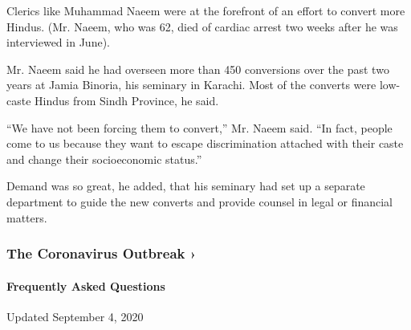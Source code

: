 Clerics like Muhammad Naeem were at the forefront of an effort to
convert more Hindus. (Mr. Naeem, who was 62, died of cardiac arrest two
weeks after he was interviewed in June).

Mr. Naeem said he had overseen more than 450 conversions over the past
two years at Jamia Binoria, his seminary in Karachi. Most of the
converts were low-caste Hindus from Sindh Province, he said.

``We have not been forcing them to convert,'' Mr. Naeem said. ``In fact,
people come to us because they want to escape discrimination attached
with their caste and change their socioeconomic status.''

Demand was so great, he added, that his seminary had set up a separate
department to guide the new converts and provide counsel in legal or
financial matters.

\href{https://www.nytimes3xbfgragh.onion/news-event/coronavirus?action=click\&pgtype=Article\&state=default\&region=MAIN_CONTENT_3\&context=storylines_faq}{}

\hypertarget{the-coronavirus-outbreak-}{%
\subsubsection{The Coronavirus Outbreak
›}\label{the-coronavirus-outbreak-}}

\hypertarget{frequently-asked-questions}{%
\paragraph{Frequently Asked
Questions}\label{frequently-asked-questions}}

Updated September 4, 2020

